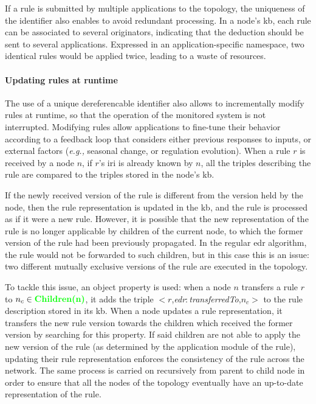 \documentclass{iosart2c}
\newcommand{\added}[1]{\textcolor{green}{\textbf{#1}}}
\newcommand{\namespace}[1]{\textit{#1$:$}}
\newcommand{\concept}[2]{\namespace{#1}\-\textit{#2}}
\newcommand{\triplet}[3]{$<$#1,\textit{#2},#3$>$}
\begin{document}
If a rule is submitted by multiple applications to the topology, the uniqueness of the identifier also enables to avoid redundant processing.
In a node's \gls{kb}, each rule can be associated to several originators, indicating that the deduction should be sent to several applications.
Expressed in an application-specific namespace, two identical rules would be applied twice, leading to a waste of resources.

\paragraph{Updating rules at runtime} 

The use of a unique dereferencable identifier also allows to incrementally modify rules at runtime, so that the operation of the monitored system is not interrupted.
Modifying rules allow applications to fine-tune their behavior according to a feedback loop that considers either previous responses to inputs, or external factors (\textit{e.g.,} seasonal change, or regulation evolution).
When a rule $r$ is received by a node $n$, if $r$'s \gls{iri} is already known by $n$, all the triples describing the rule are compared to the triples stored in the node's \gls{kb}.

If the newly received version of the rule is different from the version held by the node, then the rule representation is updated in the \gls{kb}, and the rule is processed as if it were a new rule.
However, it is possible that the new representation of the rule is no longer applicable by children of the current node, to which the former version of the rule had been previously propagated.
In the regular \gls{edr} algorithm, the rule would not be forwarded to such children, but in this case this is an issue: two different mutually exclusive versions of the rule are executed in the topology.

To tackle this issue, an object property is used: when a node $n$ transfers a rule $r$ to $n_{c}\in \added{Children(n)}$, it adds the triple \triplet{$r$}{\concept{edr}{transferred\-To}}{$n_{c}$} to the rule description stored in its \gls{kb}.
When a node updates a rule representation, it transfers the new rule version towards the children which received the former version by searching for this property.
If said children are not able to apply the new version of the rule (as determined by the application module of the rule), updating their rule representation enforces the consistency of the rule across the network. 
The same process is carried on recursively from parent to child node in order to ensure that all the nodes of the topology eventually have an up-to-date representation of the rule.
\end{document}
